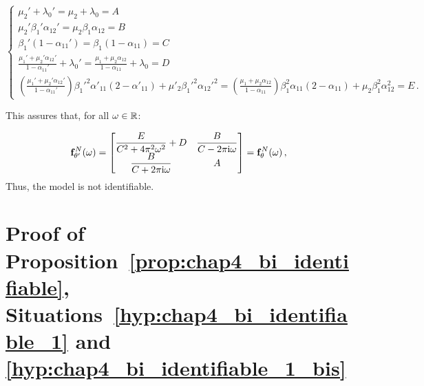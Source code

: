 \begin{subappendices}
\begin{itemize}
\begin{equation*}
\begin{cases}
  \mu_2' + \lambda_0' = \mu_2 + \lambda_0 = A\\
   \mu_2' \beta_1' \alpha_{12}' = \mu_2 \beta_1 \alpha_{12} = B\\
  \beta_1' (1-\alpha_{11}') = \beta_1 (1-\alpha_{11}) = C\\
  \frac{\mu_1' + \mu_2' \alpha_{12}'}{1-\alpha_{11}'} + \lambda_0' = \frac{\mu_1 + \mu_2 \alpha_{12}}{1-\alpha_{11}} + \lambda_0 = D\\
  \left(\frac{\mu_1' + \mu_2' \alpha_{12}'}{1-\alpha_{11}'} \right) {\beta_1'}^2 \alpha'_{11} (2-\alpha'_{11}) + \mu'_2 {\beta_1'}^2 {\alpha_{12}'}^2 = \left(\frac{\mu_1 + \mu_2 \alpha_{12}}{1-\alpha_{11}} \right) \beta_1^2 \alpha_{11} (2-\alpha_{11}) + \mu_2 \beta_1^2 \alpha_{12}^2 = E\,.
\end{cases}
\end{equation*}

This assures that, for all $\omega \in {\mathbb R}$:

\[
\mathbf{f}_{\theta'}^N(\omega) = \begin{bmatrix}
  \dfrac{E}{C^2 + 4 \pi^2 \omega^2} + D & \dfrac{B}{C - 2 \pi \mathrm{i} \omega}\\
  \dfrac{B}{C + 2 \pi \mathrm{i} \omega} & A
\end{bmatrix} 
= \mathbf{f}_{\theta}^N(\omega) \,,
\]
Thus, the model is not identifiable.
\end{itemize}










\section{Proof of Proposition~\ref{prop:chap4_bi_identifiable}, Situations~\ref{hyp:chap4_bi_identifiable_1} and \ref{hyp:chap4_bi_identifiable_1_bis}}\label{appendix:chap4_bi_identifiable_1}


\end{subappendices}
